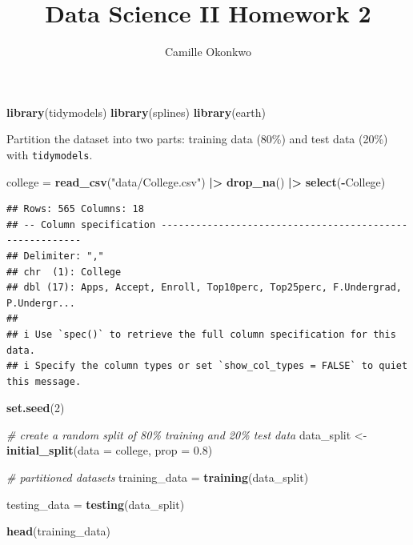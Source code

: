 \documentclass[
]{article}
\title{Data Science II Homework 2}
\author{Camille Okonkwo}
\date{}
\newenvironment{Shaded}{\begin{snugshade}}{\end{snugshade}}
\newcommand{\AttributeTok}[1]{\textcolor[rgb]{0.13,0.29,0.53}{#1}}
\newcommand{\CommentTok}[1]{\textcolor[rgb]{0.56,0.35,0.01}{\textit{#1}}}
\newcommand{\DecValTok}[1]{\textcolor[rgb]{0.00,0.00,0.81}{#1}}
\newcommand{\FloatTok}[1]{\textcolor[rgb]{0.00,0.00,0.81}{#1}}
\newcommand{\FunctionTok}[1]{\textcolor[rgb]{0.13,0.29,0.53}{\textbf{#1}}}
\newcommand{\NormalTok}[1]{#1}
\newcommand{\OtherTok}[1]{\textcolor[rgb]{0.56,0.35,0.01}{#1}}
\newcommand{\SpecialCharTok}[1]{\textcolor[rgb]{0.81,0.36,0.00}{\textbf{#1}}}
\newcommand{\StringTok}[1]{\textcolor[rgb]{0.31,0.60,0.02}{#1}}
\begin{document}
\maketitle

{
\setcounter{tocdepth}{2}
\tableofcontents
}
\newpage

\begin{Shaded}
\begin{Highlighting}[]
\FunctionTok{library}\NormalTok{(tidymodels)}
\FunctionTok{library}\NormalTok{(splines)}
\FunctionTok{library}\NormalTok{(earth)}
\end{Highlighting}
\end{Shaded}

Partition the dataset into two parts: training data (80\%) and test data
(20\%) with \texttt{tidymodels}.

\begin{Shaded}
\begin{Highlighting}[]
\NormalTok{college }\OtherTok{=} \FunctionTok{read\_csv}\NormalTok{(}\StringTok{"data/College.csv"}\NormalTok{) }\SpecialCharTok{|\textgreater{}}
  \FunctionTok{drop\_na}\NormalTok{() }\SpecialCharTok{|\textgreater{}} 
  \FunctionTok{select}\NormalTok{(}\SpecialCharTok{{-}}\NormalTok{College)}
\end{Highlighting}
\end{Shaded}

\begin{verbatim}
## Rows: 565 Columns: 18
## -- Column specification --------------------------------------------------------
## Delimiter: ","
## chr  (1): College
## dbl (17): Apps, Accept, Enroll, Top10perc, Top25perc, F.Undergrad, P.Undergr...
## 
## i Use `spec()` to retrieve the full column specification for this data.
## i Specify the column types or set `show_col_types = FALSE` to quiet this message.
\end{verbatim}

\begin{Shaded}
\begin{Highlighting}[]
\FunctionTok{set.seed}\NormalTok{(}\DecValTok{2}\NormalTok{)}

\CommentTok{\# create a random split of 80\% training and 20\% test data}
\NormalTok{data\_split }\OtherTok{\textless{}{-}} \FunctionTok{initial\_split}\NormalTok{(}\AttributeTok{data =}\NormalTok{ college, }\AttributeTok{prop =} \FloatTok{0.8}\NormalTok{)}

\CommentTok{\# partitioned datasets}
\NormalTok{training\_data }\OtherTok{=} \FunctionTok{training}\NormalTok{(data\_split)}

\NormalTok{testing\_data }\OtherTok{=} \FunctionTok{testing}\NormalTok{(data\_split)}

\FunctionTok{head}\NormalTok{(training\_data)}
\end{Highlighting}
\end{Shaded}
\end{document}
